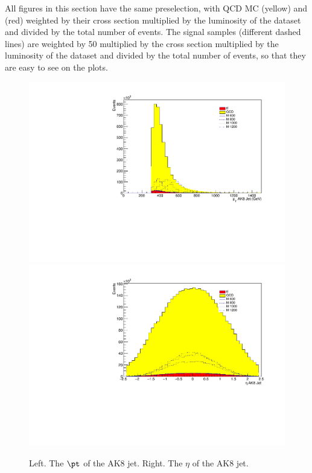 All figures in this section have the same preselection, with QCD MC (yellow) and \ttbar (red) weighted by their cross section multiplied by the luminosity of the dataset and divided by the total number of events. The signal samples (different dashed lines) are weighted by 50 multiplied by the cross section multiplied by the luminosity of the dataset and divided by the total number of events, so that they are easy to see on the plots. 

\begin{figure}[thb!]
\begin{center}
\includegraphics[scale=0.34]{F5/shapeptFJ.pdf}
\includegraphics[scale=0.34]{F5/shapeetaFJ.pdf}\\
\end{center}
\caption{Left. The $\pt$ of the AK8 jet. Right. The $\eta$ of the AK8 jet.}
\label{fig:AK8pteta}
\end{figure} 

